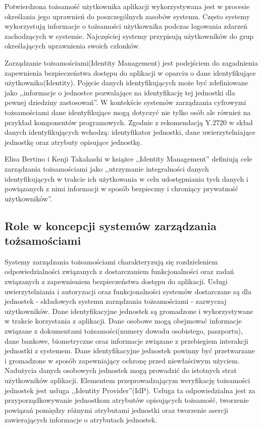 	Potwierdzona tożsamość użytkownika aplikacji wykorzystywana jest w procesie określania jego uprawnień do poszczególnych zasobów systemu. Często systemy wykorzystują informacje o tożsamości użytkownika podczas logowania zdarzeń zachodzących w systemie. Najczęściej systemy przypisują użytkowników do grup określających uprawnienia swoich członków.



\label{sec:konceptcjaIdM}

	Zarządzanie tożsamościami(Identity Management) jest podejściem do zagadnienia zapewnienia bezpieczeństwa dostępu do aplikacji w oparciu o dane identyfikujące użytkownika(Identity). Pojęcie danych identyfikujących może być zdefiniowane jako ,,informacje o jednostce pozwalające na identyfikację tej jednostki dla pewnej dziedziny zastosowań''\cite{Itu09}. W kontekście systemów zarządzania cyfrowymi tożsamościami dane identyfikujące mogą dotyczyć nie tylko osób ale również na przykład komponentów programowych\cite{Bertino11}. Zgodnie z rekomendacją Y.2720 w skład danych identyfikujących wchodzą: identyfikator jednostki, dane uwierzytelniające jednostkę oraz atrybuty opisujące jednostkę\cite{Itu09}.

	Elisa Bertino i Kenji Takahashi w książce ,,Identity Management'' definiują cele zarządzania tożsamościami jako ,,utrzymanie integralności danych identyfikujących w trakcie ich użytkowania w celu udostępniania tych danych i powiązanych z nimi informacji w sposób bezpieczny i chroniący prywatność użytkowników''\cite{Bertino11}.
	 
	\subsection{Role w koncepcji systemów zarządzania tożsamościami}

		Systemy zarządzania tożsamościami charakteryzują się rozdzieleniem odpowiedzialności związanych z dostarczaniem funkcjonalności oraz zadań związanych z zapewnieniem bezpieczeństwa dostępu do aplikacji. Usługi uwierzytelniania i autoryzacji oraz funkcjonalności systemów dostarczane są dla jednostek - składowych systemu zarządzania tożsamościami - zazwyczaj użytkowników.
		Dane identyfikacyjne jednostek są gromadzone i wykorzystywane w trakcie korzystania z aplikacji. Dane osobowe mogą obejmować informacje związane z dokumentami tożsamości(numery dowodu osobistego, paszportu), dane bankowe, biometryczne oraz informacje związane z przebiegiem interakcji jednostki z systemem. Dane identyfikacyjne jednostek powinny być przetwarzane i gromadzone w sposób zapewniający  ochronę przed niewłaściwym użyciem. Nadużycia danych osobowych jednostek mogą prowadzić do istotnych strat użytkowników aplikacji.
		Elementem przeprowadzającym weryfikację tożsamości jednostek jest usługa ,,Identity Provider''(IdP). Usługa ta odpowiedzialna jest za przyporządkowywanie jednostkom atrybutów opisujących tożsamość, tworzenie powiązań pomiędzy różnymi atrybutami jednostki oraz tworzenie asercji zawierających informacje o atrybutach jednostek. 


